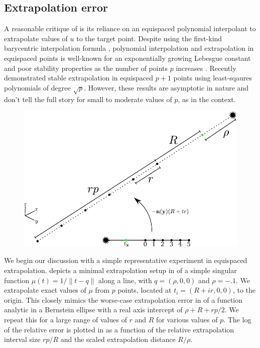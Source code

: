 \subsection{Extrapolation error\label{sec:extrap_error}}
A reasonable critique of \qbkix is its reliance on an equispaced polynomial interpolant to extrapolate values of $u$ to the target point.
Despite using the first-kind barycentric interpolation formula \cite{webb2012stability}, polynomial interpolation and extrapolation in equispaced points is well-known for an exponentially growing Lebesgue constant and poor stability properties as the number of points $p$ increases \cite{trefethen1991two,platte2011impossibility}.
Recently \cite{DT} demonstrated stable extrapolation in equispaced $p+1$ points
using least-sqaures polynomials of degree $\sqrt{p}$.
However, these results are asymptotic in nature and don't tell the full story for small to moderate values of $p$, as in the \qbkix context.

\begin{figure}[!htb]
      \centering
      \includegraphics[width=.45\linewidth]{figs/extrapolation_error_schematic.pdf}
\end{figure}

We begin our discussion with a simple representative experiment in equispaced extrapolation.
 depicts a minimal extrapolation setup in \threed of a simple singular function $\mu(t) = 1/\|t-q\|$ along a line, with $q = (\rho, 0, 0)$ and $\rho = -.1$.
We extrapolate exact values of $\mu$ from $p$ points, located at $t_i = (R + ir,0,0)$, to the origin.
This closely mimics the worse-case extrapolation error in \oned of a function analytic in a Bernstein ellipse with a real axis intercept of $\rho+R+ rp/2$.
We repeat this for a large range of values of $r$ and $R$ for various values of $p$. 
The log of the relative error is plotted in  as a function of the relative extrapolation interval size $rp/R$ and the scaled extrapolation distance $R/\rho$.

